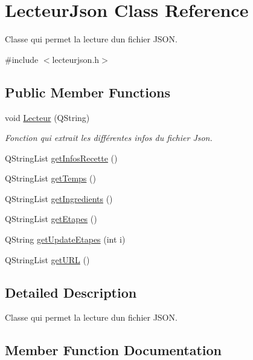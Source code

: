 \hypertarget{class_lecteur_json}{}\section{Lecteur\+Json Class Reference}
\label{class_lecteur_json}


Classe qui permet la lecture d\textquotesingle{}un fichier J\+S\+ON.  




{\ttfamily \#include $<$lecteurjson.\+h$>$}

\subsection*{Public Member Functions}
\begin{DoxyCompactItemize}
\item 
void \hyperlink{class_lecteur_json_a6b74dbecd8cb87168fb2d36bc1a22f2b}{Lecteur} (Q\+String)
\begin{DoxyCompactList}\small\item\em Fonction qui extrait les différentes infos du fichier Json. \end{DoxyCompactList}\item 
Q\+String\+List \hyperlink{class_lecteur_json_a0c507870050e16de3688d310d1f3b65a}{get\+Infos\+Recette} ()
\item 
Q\+String\+List \hyperlink{class_lecteur_json_a88d73523c1775a8c7001b5abae152740}{get\+Temps} ()
\item 
Q\+String\+List \hyperlink{class_lecteur_json_a0c18d502de54aea85b4d76f1b2858423}{get\+Ingredients} ()
\item 
Q\+String\+List \hyperlink{class_lecteur_json_ab698142bf586bb224c35962525ce3915}{get\+Etapes} ()
\item 
Q\+String \hyperlink{class_lecteur_json_ad3a86b8dc577d1e6d77a66b8ece8442a}{get\+Update\+Etapes} (int i)
\item 
Q\+String\+List \hyperlink{class_lecteur_json_a4ceacda970b2b838bb41211decdd799f}{get\+U\+RL} ()
\end{DoxyCompactItemize}


\subsection{Detailed Description}
Classe qui permet la lecture d\textquotesingle{}un fichier J\+S\+ON. 

\subsection{Member Function Documentation}
\mbox{\label{class_lecteur_json_ab698142bf586bb224c35962525ce3915}} 
